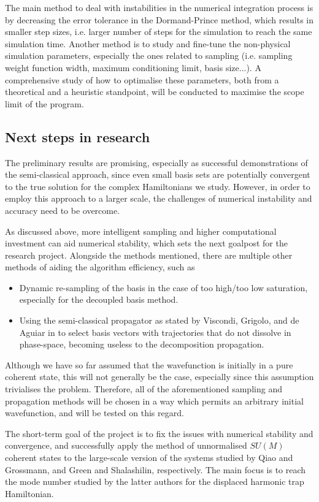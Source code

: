 \documentclass[12pt]{article}
\begin{document}
	The main method to deal with instabilities in the numerical integration process is by decreasing the error tolerance in the Dormand-Prince method, which results in smaller step sizes, i.e. larger number of steps for the simulation to reach the same simulation time. Another method is to study and fine-tune the non-physical simulation parameters, especially the ones related to sampling (i.e. sampling weight function width, maximum conditioning limit, basis size...). A comprehensive study of how to optimalise these parameters, both from a theoretical and a heuristic standpoint, will be conducted to maximise the scope limit of the program.
	
	
	\subsection{Next steps in research}
	The preliminary results are promising, especially as successful demonstrations of the semi-classical approach, since even small basis sets are potentially convergent to the true solution for the complex Hamiltonians we study. However, in order to employ this approach to a larger scale, the challenges of numerical instability and accuracy need to be overcome.
	
	As discussed above, more intelligent sampling and higher computational investment can aid numerical stability, which sets the next goalpost for the research project. Alongside the methods mentioned, there are multiple other methods of aiding the algorithm efficiency, such as
	\begin{itemize}
		\item Dynamic re-sampling of the basis in the case of too high/too low saturation, especially for the decoupled basis method.
		\item Using the semi-classical propagator as stated by Viscondi, Grigolo, and de Aguiar in \cite{Aguiar} to select basis vectors with trajectories that do not dissolve in phase-space, becoming useless to the decomposition propagation.
	\end{itemize}
	
	Although we have so far assumed that the wavefunction is initially in a pure coherent state, this will not generally be the case, especially since this assumption trivialises the problem. Therefore, all of the aforementioned sampling and propagation methods will be chosen in a way which permits an arbitrary initial wavefunction, and will be tested on this regard.
	
	The short-term goal of the project is to fix the issues with numerical stability and convergence, and successfully apply the method of unnormalised $SU(M)$ coherent states to the large-scale version of the systems studied by Qiao and Grossmann, and Green and Shalashilin, respectively. The main focus is to reach the mode number studied by the latter authors for the displaced harmonic trap Hamiltonian.
	
\end{document}
